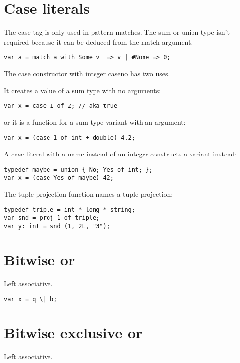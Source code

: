 \documentclass[oneside]{book}
\begin{document}
\section{Case literals}

The case tag is only used in pattern matches.
The sum or union type isn't required because it can be deduced
from the match argument.

\begin{verbatim}
var a = match a with Some v  => v | #None => 0;
\end{verbatim}


The case constructor with integer caseno has two uses. 

It creates a value of
a sum type with no arguments:

\begin{verbatim}
var x = case 1 of 2; // aka true
\end{verbatim}

or it is a function for a sum type variant with an argument:

\begin{verbatim}
var x = (case 1 of int + double) 4.2;
\end{verbatim}


A case literal with a name instead of an integer constructs
a variant instead:

\begin{verbatim}
typedef maybe = union { No; Yes of int; };
var x = (case Yes of maybe) 42;
\end{verbatim}


The tuple projection function names a tuple projection:

\begin{verbatim}
typedef triple = int * long * string;
var snd = proj 1 of triple;
var y: int = snd (1, 2L, "3");
\end{verbatim}


\section{Bitwise or}
Left associative.

\begin{verbatim}
var x = q \| b;
\end{verbatim}


\section{Bitwise exclusive or}
Left associative.
\end{document}
